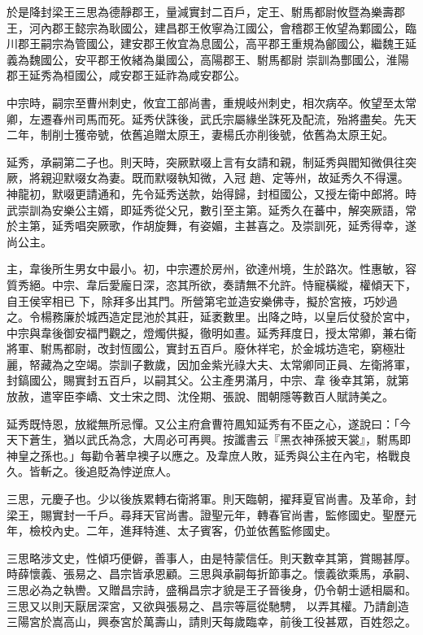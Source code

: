 \begin{pinyinscope}
 於是降封梁王三思為德靜郡王，量減實封二百戶，定王、駙馬都尉攸暨為樂壽郡王，河內郡王懿宗為耿國公，建昌郡王攸寧為江國公，會稽郡王攸望為鄴國公，臨川郡王嗣宗為管國公，建安郡王攸宜為息國公，高平郡王重規為鄶國公，繼魏王延義為魏國公，安平郡王攸緒為巢國公，高陽郡王、駙馬都尉
 崇訓為酆國公，淮陽郡王延秀為桓國公，咸安郡王延祚為咸安郡公。



 中宗時，嗣宗至曹州刺史，攸宜工部尚書，重規岐州刺史，相次病卒。攸望至太常卿，左遷春州司馬而死。延秀伏誅後，武氏宗屬緣坐誅死及配流，殆將盡矣。先天二年，制削士獲帝號，依舊追贈太原王，妻楊氏亦削後號，依舊為太原王妃。



 延秀，承嗣第二子也。則天時，突厥默啜上言有女請和親，制延秀與閻知微俱往突厥，將親迎默啜女為妻。既而默啜執知微，入冠
 趙、定等州，故延秀久不得還。神龍初，默啜更請通和，先令延秀送款，始得歸，封桓國公，又授左衛中郎將。時武崇訓為安樂公主婿，即延秀從父兄，數引至主第。延秀久在蕃中，解突厥語，常於主第，延秀唱突厥歌，作胡旋舞，有姿媚，主甚喜之。及崇訓死，延秀得幸，遂尚公主。



 主，韋後所生男女中最小。初，中宗遷於房州，欲達州境，生於路次。性惠敏，容質秀絕。中宗、韋后愛龐日深，恣其所欲，奏請無不允許。恃寵橫縱，權傾天下，自王侯宰相已
 下，除拜多出其門。所營第宅並造安樂佛寺，擬於宮掖，巧妙過之。令楊務廉於城西造定昆池於其莊，延袤數里。出降之時，以皇后仗發於宮中，中宗與韋後御安福門觀之，燈燭供擬，徹明如晝。延秀拜度日，授太常卿，兼右衛將軍、駙馬都尉，改封恆國公，實封五百戶。廢休祥宅，於金城坊造宅，窮極壯麗，帑藏為之空竭。崇訓子數歲，因加金紫光祿大夫、太常卿同正員、左衛將軍，封鎬國公，賜實封五百戶，以嗣其父。公主產男滿月，中宗、韋
 後幸其第，就第放赦，遣宰臣李嶠、文士宋之問、沈佺期、張說、閻朝隱等數百人賦詩美之。



 延秀既恃恩，放縱無所忌憚。又公主府倉曹符鳳知延秀有不臣之心，遂說曰：「今天下蒼生，猶以武氏為念，大周必可再興。按讖書云『黑衣神孫披天裳』，駙馬即神皇之孫也。」每勸令著皁襖子以應之。及韋庶人敗，延秀與公主在內宅，格戰良久。皆斬之。後追貶為悖逆庶人。



 三思，元慶子也。少以後族累轉右衛將軍。則天臨朝，擢拜夏官尚書。及革命，封
 梁王，賜實封一千戶。尋拜天官尚書。證聖元年，轉春官尚書，監修國史。聖歷元年，檢校內史。二年，進拜特進、太子賓客，仍並依舊監修國史。



 三思略涉文史，性傾巧便僻，善事人，由是特蒙信任。則天數幸其第，賞賜甚厚。時薛懷義、張易之、昌宗皆承恩顧。三思與承嗣每折節事之。懷義欲乘馬，承嗣、三思必為之執轡。又贈昌宗詩，盛稱昌宗才貌是王子晉後身，仍令朝士遞相屬和。三思又以則天厭居深宮，又欲與張易之、昌宗等扈從馳騁，
 以弄其權。乃請創造三陽宮於嵩高山，興泰宮於萬壽山，請則天每歲臨幸，前後工役甚眾，百姓怨之。




\end{pinyinscope}
